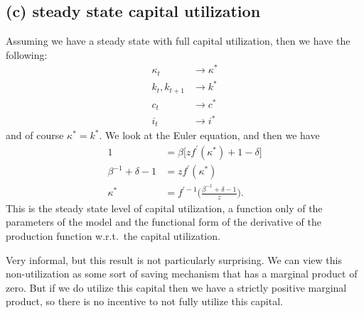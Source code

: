 \documentclass[a4paper]{article}
\theoremstyle{definition}
\begin{document}
\subsection{(c) steady state capital utilization}
Assuming we have a steady state with full capital utilization, then we have the following:
	\begin{align*}
	\kappa_t 					&\rightarrow \kappa^* \\
	k_t ,k_{t+1}				&\rightarrow k^* \\
	c_t 						&\rightarrow c^* \\
	i_t 							&\rightarrow i^* 
	\end{align*}
and of course $\kappa^* = k^*$. We look at the Euler equation, and then we have
	\begin{align*}
	1 							&= \beta \big[ z f^\prime(\kappa^*)+1-\delta \big] \\
	\beta^{-1} +\delta-1	&= z f^\prime (\kappa^*) \\
	\kappa^* 				&= f^{\prime -1} \Big( \frac{\beta^{-1} + \delta - 1}{z} \Big).
	\end{align*}	
This is the steady state level of capital utilization, a function only of the parameters of the model and the functional form of the derivative of the production function w.r.t.\ the capital utilization.	

Very informal, but this result is not particularly surprising. We can view this non-utilization as some sort of saving mechanism that has a marginal product of zero. But if we do utilize this capital then we have a strictly positive marginal product, so there is no incentive to not fully utilize this capital.
%
%
%
%
%
%
%
%
%
%
%
%
%
\newpage
\end{document}
